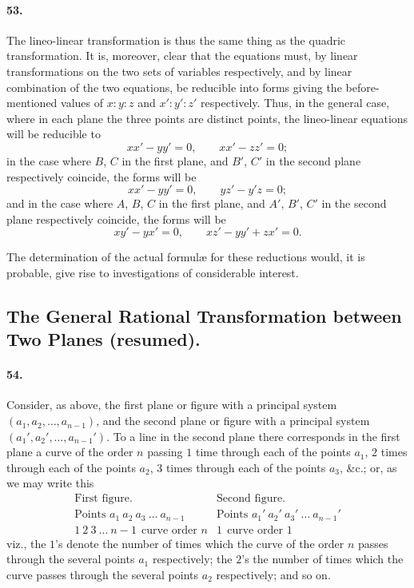 \documentclass[11pt]{article}
\begin{document}
\medskip

\paragraph{53.}
The lineo-linear transformation is thus the same thing as the quadric
transformation. It is, moreover, clear that the equations must, by linear
transformations on the two sets of variables respectively, and by linear
combination of the two equations, be reducible into forms giving the
before-mentioned values of $x:y:z$ and $x':y':z'$ respectively. Thus, in
the general case, where in each plane the three points are distinct
points, the lineo-linear equations will be reducible to
\[
xx'-yy'=0,\qquad xx'-zz'=0;
\]
in the case where $B$, $C$ in the first plane, and $B'$, $C'$ in the
second plane respectively coincide, the forms will be
\[
xx'-yy'=0,\qquad yz'-y'z=0;
\]
and in the case where $A$, $B$, $C$ in the first plane, and $A'$, $B'$,
$C'$ in the second plane respectively coincide, the forms will be
\[
xy'-yx'=0,\qquad xz'-yy'+zx'=0.
\]

\medskip

The determination of the actual formul\ae{} for these reductions would,
it is probable, give rise to investigations of considerable interest.

\bigskip

\subsection*{The General Rational Transformation between Two Planes (resumed).}

\paragraph{54.}
Consider, as above, the first plane or figure with a principal system
$(a_{1},a_{2},\ldots,a_{n-1})$, and the second plane or figure with a
principal system $(a_{1}',a_{2}',\ldots,a_{n-1}')$. To a line in the
second plane there corresponds in the first plane a curve of the order
$n$ passing $1$ time through each of the points $a_{1}$, $2$ times
through each of the points $a_{2}$, $3$ times through each of the points
$a_{3}$, \&c.; or, as we may write this
\[
\begin{array}{l|l}
\text{First figure.} & \text{Second figure.}\\[2pt]
\text{Points }a_{1}\ a_{2}\ a_{3}\ \ldots\ a_{n-1} &
\text{Points }a_{1}'\ a_{2}'\ a_{3}'\ \ldots\ a_{n-1}'\\
1\ 2\ 3\ \ldots\ n-1\ \ \text{curve order }n & 1\ \ \text{curve order }1
\end{array}
\]
viz., the $1$'s denote the number of times which the curve of the order
$n$ passes through the several points $a_{1}$ respectively; the $2$'s the
number of times which the curve passes through the several points $a_{2}$
respectively; and so on.
\end{document}
